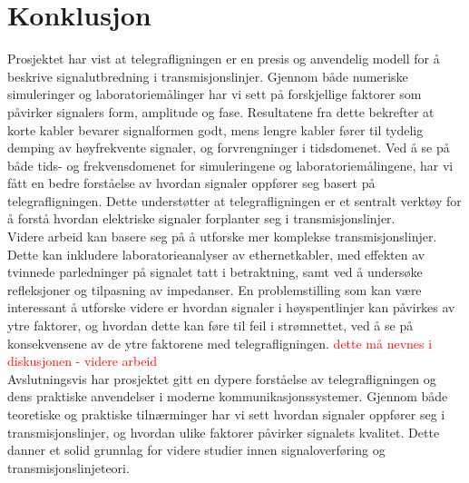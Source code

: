 \section{Konklusjon}
Prosjektet har vist at telegrafligningen er en presis og anvendelig modell for å beskrive signalutbredning i transmisjonslinjer. Gjennom både numeriske simuleringer og laboratoriemålinger har vi sett på forskjellige faktorer som påvirker signalers form, amplitude og fase. Resultatene fra dette bekrefter at korte kabler bevarer signalformen godt, mens lengre kabler fører til tydelig demping av høyfrekvente signaler, og forvrengninger i tidsdomenet. Ved å se på både tids- og frekvensdomenet for simuleringene og laboratoriemålingene, har vi fått en bedre forståelse av hvordan signaler oppfører seg basert på telegrafligningen. Dette understøtter at telegrafligningen er et sentralt verktøy for å forstå hvordan elektriske signaler forplanter seg i transmisjonslinjer.
\\[1em]
Videre arbeid kan basere seg på å utforske mer komplekse transmisjonslinjer. Dette kan inkludere laboratorieanalyser av ethernetkabler, med effekten av tvinnede parledninger på signalet tatt i betraktning, samt ved å undersøke refleksjoner og tilpasning av impedanser. En problemstilling som kan være interessant å utforske videre er hvordan signaler i høyspentlinjer kan påvirkes av ytre faktorer, og hvordan dette kan føre til feil i strømnettet, ved å se på konsekvensene av de ytre faktorene med telegrafligningen. \textcolor{red}{dette må nevnes i diskusjonen - videre arbeid}
\\[1em]
Avslutningsvis har prosjektet gitt en dypere forståelse av telegrafligningen og dens praktiske anvendelser i moderne kommunikasjonssystemer. Gjennom både teoretiske og praktiske tilnærminger har vi sett hvordan signaler oppfører seg i transmisjonslinjer, og hvordan ulike faktorer påvirker signalets kvalitet. Dette danner et solid grunnlag for videre studier innen signaloverføring og transmisjonslinjeteori.